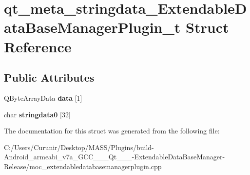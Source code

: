 \hypertarget{structqt__meta__stringdata___extendable_data_base_manager_plugin__t}{}\section{qt\+\_\+meta\+\_\+stringdata\+\_\+\+Extendable\+Data\+Base\+Manager\+Plugin\+\_\+t Struct Reference}
\label{structqt__meta__stringdata___extendable_data_base_manager_plugin__t}
\subsection*{Public Attributes}
\begin{DoxyCompactItemize}
\item 
\mbox{\label{structqt__meta__stringdata___extendable_data_base_manager_plugin__t_aada95202d0c0a020265e9404cb2fa195}} 
Q\+Byte\+Array\+Data {\bfseries data} \mbox{[}1\mbox{]}
\item 
\mbox{\label{structqt__meta__stringdata___extendable_data_base_manager_plugin__t_a9bebd76ef9aa0268625c5d456f8ab514}} 
char {\bfseries stringdata0} \mbox{[}32\mbox{]}
\end{DoxyCompactItemize}


The documentation for this struct was generated from the following file\+:\begin{DoxyCompactItemize}
\item 
C\+:/\+Users/\+Curunir/\+Desktop/\+M\+A\+S\+S/\+Plugins/build-\/\+Android\+\_\+armeabi\+\_\+v7a\+\_\+\+G\+C\+C\+\_\+\_\+\_\+\+Qt\+\_\+\_\+\_-\/\+Extendable\+Data\+Base\+Manager-\/\+Release/moc\+\_\+extendabledatabasemanagerplugin.\+cpp\end{DoxyCompactItemize}
